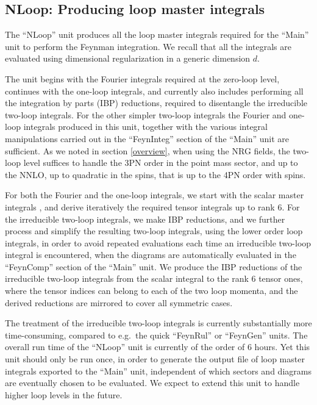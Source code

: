 \documentclass[a4paper,11pt]{article}
\begin{document}
\subsection{NLoop: Producing loop master integrals} 
\label{nloop}

The ``NLoop'' unit produces all the loop master integrals required for the ``Main'' unit to 
perform the Feynman integration. We recall that all the integrals are evaluated using 
dimensional regularization in a generic dimension $d$.

The unit begins with the Fourier integrals required at the zero-loop level, continues with 
the one-loop integrals, and currently also includes performing all the integration by parts 
(IBP) reductions, required to disentangle the irreducible two-loop integrals. For the other 
simpler two-loop integrals the Fourier and one-loop integrals produced in this unit, 
together with the various integral manipulations carried out in the ``FeynInteg'' section of 
the ``Main'' unit are sufficient. As we noted in section \ref{overview}, when using the NRG 
fields, the two-loop level suffices to handle the 3PN order in the point mass sector, and up 
to the NNLO, up to quadratic in the spins, that is up to the 4PN order with spins.

For both the Fourier and the one-loop integrals, we start with the scalar master integrals 
\cite{Levi:2011eq}, and derive iteratively the required tensor integrals up to rank 6. 
For the irreducible two-loop integrals, we make IBP reductions, and we further process and 
simplify the resulting two-loop integrals, using the lower order loop integrals, in order to 
avoid repeated evaluations each time an irreducible two-loop integral is encountered, when 
the diagrams are automatically evaluated in the ``FeynComp'' section of the ``Main'' unit. 
We produce the IBP reductions of the irreducible two-loop integrals from the scalar 
integral to the rank 6 tensor ones, where the tensor indices can belong to each of the two 
loop momenta, and the derived reductions are mirrored to cover all symmetric cases.

The treatment of the irreducible two-loop integrals is currently substantially more
time-consuming, compared to e.g.~the quick ``FeynRul'' or ``FeynGen'' units. The overall run 
time of the ``NLoop'' unit is currently of the order of 6 hours. Yet this unit should only 
be run once, in order to generate the output file of loop master integrals exported to the 
``Main'' unit, independent of which sectors and diagrams are eventually chosen to be 
evaluated. We expect to extend this unit to handle higher loop levels in the future.
\end{document}
